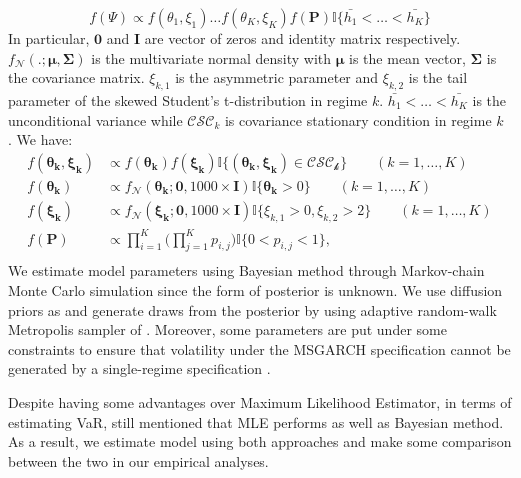 \documentclass[12pt,a4paper]{article}
\begin{document}
\begin{equation}
	f(\Psi) \propto f(\theta_1, \xi_1) \ldots f(\theta_K, \xi_K)f(\mathbf{P}) \mathbb{I}\{\bar{h_1} < \ldots < \bar{h_K}\}
\end{equation}
In particular, $\mathbf{0}$ and $\mathbf{I}$ are vector of zeros and identity matrix respectively. $f_\mathcal{N} (.; \mathbf{\mu},\mathbf{\Sigma})$ is the multivariate normal density with $\mathbf{\mu}$ is the mean vector, $\mathbf{\Sigma}$ is the covariance matrix. $\xi_{k,1}$ is the asymmetric parameter and $\xi_{k,2}$ is the tail parameter of the skewed Student's t-distribution in regime $k$. $\bar{h_1} < \ldots < \bar{h_K}$ is the unconditional variance while $\mathcal{CSC}_k$ is covariance stationary condition in regime $k$ \citep{ardia2018forecasting}. We have: 
\begin{align}
	f(\bm{\theta_k}, \bm{\xi_k}) &\propto f(\bm{\theta_k})f(\bm{\xi_k}) \mathbb{I}\{(\bm{\theta_k}, \bm{\xi_k}) \in\mathcal{CSC_{k}}\} \qquad (k = 1, \ldots,K) \nonumber \\
	f(\bm{\theta_k}) &\propto f_\mathcal{N}(\bm{\theta_k}; \bm{0}, 1000 \times \bm{I}) \mathbb{I}\{\bm{\theta_k} > 0\} \qquad (k = 1, \ldots,K) \nonumber \\
	f(\bm{\xi_k}) &\propto f_\mathcal{N}(\bm{\xi_k}; \bm{0}, 1000 \times \bm{I}) \mathbb{I}\{\xi_{k,1} > 0, \xi_{k,2} > 2\} \qquad (k = 1, \ldots,K)\nonumber \\
	f(\bm{P}) &\propto \prod^K_{i=1} \Big(\prod^K_{j=1} p_{i,j}\Big) \mathbb{I}\{0 < p_{i,j} < 1\}, \nonumber \\
\end{align}
We estimate model parameters using Bayesian method through Markov-chain Monte Carlo simulation since the form of posterior is unknown.  We use diffusion priors as \cite{ardia2018forecasting} and generate draws from the posterior by using adaptive random-walk Metropolis sampler of \cite{vihola2012robust}.  Moreover, some parameters are put under some constraints to ensure that volatility under the MSGARCH specification cannot be generated by a single-regime specification \cite{ardia2018forecasting}. \par

Despite having some advantages over Maximum Likelihood Estimator, in terms of estimating VaR, \cite{ardia2018forecasting} still mentioned that MLE performs as well as Bayesian method. As a result, we estimate model using both approaches and make some comparison between the two in our empirical analyses.\par
\end{document}
